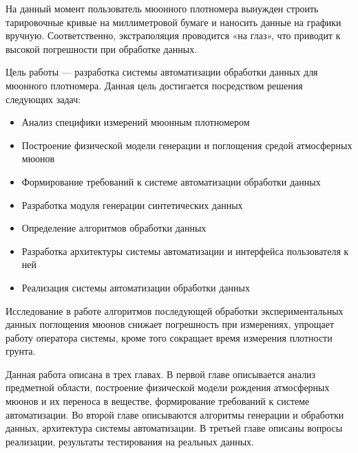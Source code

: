 \documentclass[a4paper,10pt]{article}
\begin{document}
На данный момент пользователь мюонного плотномера вынужден строить тарировочные кривые на миллиметровой бумаге 
и наносить данные на графики вручную. Соответственно, экстраполяция проводится «на глаз», что приводит к высокой 
погрешности при обработке данных.


Цель работы --- разработка системы автоматизации обработки данных для мюонного плотномера. 
Данная цель достигается посредством решения следующих задач:

\begin{itemize}
 \item Анализ специфики измерений мюонным плотномером 
 \item Построение физической модели генерации и поглощения средой атмосферных мюонов
 \item Формирование требований к системе автоматизации обработки данных
 \item Разработка модуля генерации синтетических данных 
 \item Определение алгоритмов обработки данных 
 \item Разработка архитектуры системы автоматизации и интерфейса пользователя к ней
 \item Реализация системы автоматизации обработки данных
\end{itemize}


Исследование в работе алгоритмов последующей обработки экспериментальных данных поглощения мюонов
снижает погрешность при измерениях, упрощает работу оператора системы, кроме того 
сокращает время измерения плотности грунта.


Данная работа описана в трех главах. В первой главе описывается анализ предметной области, построение физической 
модели рождения атмосферных мюонов и их переноса в веществе, формирование требований к системе автоматизации. Во второй главе
описываются алгоритмы генерации и обработки данных, архитектура системы автоматизации. В третьей главе описаны вопросы реализации, 
результаты тестирования на реальных данных.
\end{document}
